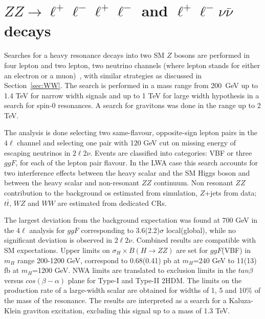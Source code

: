 \documentclass{PoS}
\begin{document}
\section{$ZZ\rightarrow \ell^+\ell^-\ell^+\ell^-$ and $\ell^+\ell^-\nu\bar{\nu}$ decays} %
\label{sec:ZZ}
Searches for a heavy resonance decays into two SM $Z$ bosons are performed in four lepton and two lepton, two neutrino channels (where lepton stands for either an electron or a muon)~\cite{HIGG-2016-19}, with similar strategies as discussed in Section~\ref{sec:WW}. 
The search is performed in a mass range from 200~GeV up to 1.4 TeV for narrow width signals and up to 1 TeV for large width hypothesis in a search for spin-0 resonances. A search for gravitons was done in the range up to 2 TeV.

The analysis is done selecting two same-flavour, opposite-sign lepton pairs in the $4\ell$ channel and selecting one pair with 120 GeV cut on missing energy of escaping neutrinos in $2\ell2\nu$.
Events are classified into categories: VBF or three $ggF$, for each of the lepton pair flavour.
In the LWA case this search accounts for two interference effects between the heavy scalar and the SM Higgs boson and between the heavy scalar and non-resonant $ZZ$ continuum.
Non resonant $ZZ$ contribution to the background os estimated from simulation, $Z$+jets from data; $t\bar{t}$, $WZ$ and $WW$ are estimated from dedicated CRs.

The largest deviation from the background expectation was found at 700 GeV in the $4\ell$ analysis for $ggF$ corresponding to 3.6(2.2)$\sigma$ local(global), while no significant deviation is observed in $2\ell2\nu$. Combined results are compatible with SM expectations. 
Upper limits on $\sigma_H \times B(H\rightarrow ZZ)$ are set for $ggF$(VBF) in $m_H$ range 200-1200 GeV, correspond to 0.68(0.41) pb at $m_H$=240 GeV to 11(13) fb at $m_H$=1200 GeV. NWA limits are translated to exclusion limits in the $tan \beta$ versus $cos(\beta-\alpha)$ plane for Type-I and Type-II 2HDM. The limits on the production rate of a large-width scalar are obtained for widths of 1, 5 and 10\% of the mass of the resonance.
The results are interpreted as a search for a Kaluza-Klein graviton excitation, excluding this signal up to a mass of 1.3 TeV. 
\end{document}
